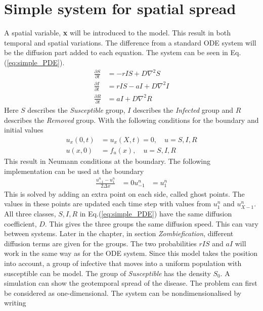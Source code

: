 \documentclass[%
twoside,                 %
final,                   %
10pt]{article}
\begin{document}
\section{Simple system for spatial spread}
A spatial variable, \textbf{x} will be introduced to the model. This result in both temporal and spatial variations. The difference from a standard ODE system will be the diffusion part added to each equation. The system can be seen in Eq.(\ref{eq:simple_PDE}). 
\begin{equation} \label{eq:simple_PDE}
	\begin{aligned}
	\frac{\partial S}{\partial t} &= -rIS + D\nabla ^2 S\\
	\frac{\partial I}{\partial t} &= rIS- aI + D\nabla ^2 I\\
	\frac{\partial R}{\partial t} &= aI + D\nabla ^2 R
	\end{aligned}
\end{equation}
Here $S$ describes the \emph{Susceptible} group, $I$ describes the \emph{Infected} group and $R$ describes the \emph{Removed} group. With the following conditions for the boundary and initial values
\begin{equation} \label{eq:boundary_initial}
	\begin{aligned}
	u_x(0,t) &= u_x(X,t) = 0,\quad u = S,I,R\\
	u(x,0) &= f_u(x),\quad u= S,I,R
	\end{aligned}
\end{equation}
This result in Neumann conditions at the boundary. The following implementation can be used at the boundary
\begin{equation}
	\begin{aligned}
	\frac{u_{-1}^n - u_1^n}{2\Delta x} &= 0
	u_{-1}^n &= u_1^n
	\end{aligned}
\end{equation}
This is solved by adding an extra point on each side, called ghost points. The values in these points are updated each time step with values from $u_1^n$ and $u_{X-1}^n$. All three classes, $S,I,R$ in Eq.(\ref{eq:simple_PDE}) have the same diffusion coefficient, $D$. This gives the three groups the same diffusion speed. This can vary between systems. Later in the chapter, in section \emph{Zombiefication}, different diffusion terms are given for the groups. The two probabilities $rIS$ and $aI$ will work in the same way as for the ODE system. Since this model takes the position into account, a group of infective that moves into a uniform population with susceptible can be model. The group of \emph{Susceptible} has the density $S_0$. A simulation can show the geotemporal spread of the disease. The problem can first be considered as one-dimensional. The system can be nondimensionalised by writing 
\end{document}
